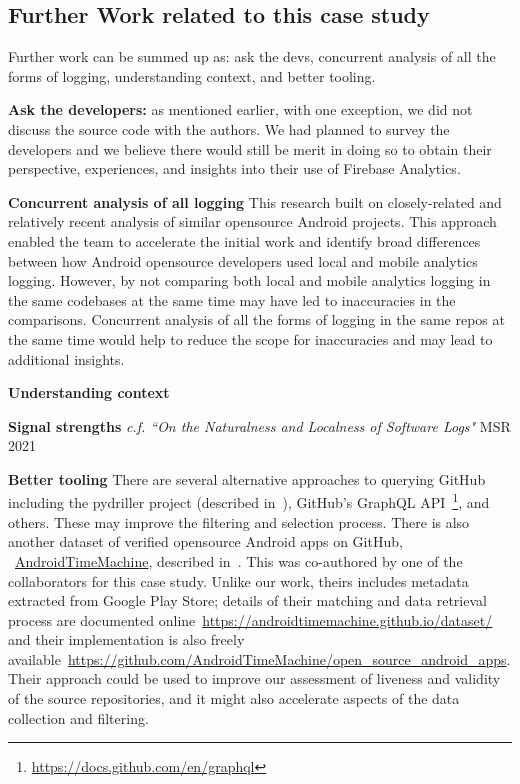 \subsection*{Further Work related to this case study}
Further work can be summed up as: ask the devs, concurrent analysis of all the forms of logging, understanding context, and better tooling.

\textbf{Ask the developers:} as mentioned earlier, with one exception, we did not discuss the source code with the authors. We had planned to survey the developers and we believe there would still be merit in doing so to obtain their perspective, experiences, and insights into their use of Firebase Analytics.

\textbf{Concurrent analysis of all logging} This research built on closely-related and relatively recent analysis of similar opensource Android projects. This approach enabled the team to accelerate the initial work and identify broad differences between how Android opensource developers used local and mobile analytics logging. However, by not comparing both local and mobile analytics logging in the same codebases at the same time may have led to inaccuracies in the comparisons. Concurrent analysis of all the forms of logging in the same repos at the same time would help to reduce the scope for inaccuracies and may lead to additional insights.

\textbf{Understanding context}

\textbf{Signal strengths} \textit{c.f. ``On the Naturalness and Localness of Software Logs"} MSR 2021

\textbf{Better tooling} There are several alternative approaches to querying GitHub including the pydriller project (described in~\citep{spadini2018_pydriller}), GitHub's GraphQL API~\footnote{\url{https://docs.github.com/en/graphql}}, and others. These may improve the filtering and selection process. There is also another dataset of verified opensource Android apps on GitHub, ~\href{https://androidtimemachine.github.io/}{AndroidTimeMachine}, described in~\citep{geiger2018_a_graph_based_dataset_of_commit_history_of_realworld_android_apps}. This was co-authored by one of the collaborators for this case study. Unlike our work, theirs includes metadata extracted from Google Play Store; details of their matching and data retrieval process are documented online~\url{https://androidtimemachine.github.io/dataset/} and their implementation is also freely available~\url{https://github.com/AndroidTimeMachine/open_source_android_apps}. Their approach could be used to improve our assessment of liveness and validity of the source repositories, and it might also accelerate aspects of the data collection and filtering.

